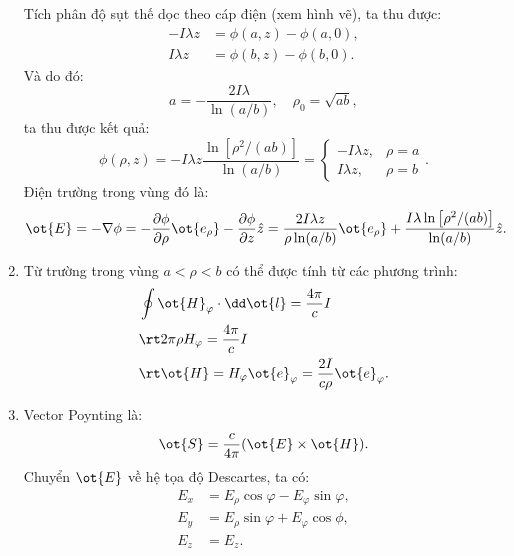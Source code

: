 \begin{loigiai}
\begin{enumerate}[1)]
Tích phân độ sụt thế dọc theo cáp điện (xem hình vẽ), ta thu được:
\begin{align*}
    -I\lambda z &= \phi(a,z) - \phi(a,0),\\
    I\lambda z &= \phi(b,z) - \phi(b,0).
\end{align*}
Và do đó:
 $$ a=- \frac {2I\lambda}{\ln(a/b)}, \quad \rho_0 = \sqrt{ab},$$
ta thu được kết quả:
  $$\phi(\rho, z)=-I \lambda z \frac{\ln \left[\rho^{2} /(a b)\right]}{\ln (a / b)}=\left\{ \begin{array}{ll}
-I \lambda z, & \rho=a \\
I \lambda z, & \rho=b
\end{array} \right. .$$
Điện trường trong vùng đó là:
  $$\ot{E}=-\nabla \phi=-\frac{\partial \phi}{\partial \rho} \ot{e_{\rho}}-\frac{\partial \phi}{\partial z} \hat{{z}}=\frac{2 I \lambda z}{\rho \ln (a / b)} \ot{e_{\rho}}+\frac{I \lambda \ln \left[\rho^{2} /(a b)\right]}{\ln (a / b)} \hat{{z}} .$$
  \item Từ trường trong vùng $a<\rho<b$ có thể được tính từ các phương trình:
  \begin{align*}
      &\oint \ot{H}_{\varphi} \cdot \dd \ot{l} = \frac{4 \pi}{c} I\\
     &\rt  2 \pi \rho H_{\varphi} = \frac{4 \pi}{c} I\\
     &\rt  \ot{H} = H_{\varphi} \ot{e}_{\varphi}=\frac{2 I}{c \rho} \ot{e}_{\varphi}.
  \end{align*}
    \item Vector Poynting là:
       $$\ot{S} = \dfrac{c}{4\pi}(\ot{E}\times \ot{H}).$$
Chuyển $\ot{E}$ về hệ tọa độ Descartes, ta có:
\begin{align*}
    E_x &= E_{\rho}\cos\varphi - E_{\varphi}\sin\varphi,\\
    E_y &= E_{\rho}\sin\varphi + E_{\varphi}\cos\phi, \\
    E_z &= E_z.
\end{align*}


\end{enumerate}
\end{loigiai}
